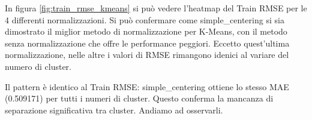 In figura \ref{fig:train_rmse_kmeans} si può vedere l'heatmap del Train RMSE per le 4 differenti normalizzazioni. Si può confermare come simple\_centering si sia dimostrato il miglior metodo di normalizzazione per K-Means, con il metodo senza normalizzazione che offre le performance peggiori. Eccetto quest'ultima normalizzazione, nelle altre i valori di RMSE rimangono idenici al variare del numero di cluster.

\begin{table}[H]
  \centering
  \caption{Top 5 Configurazioni per Train MAE - Run K-Means}
\end{table}

Il pattern è identico al Train RMSE: simple\_centering ottiene lo stesso MAE (0.509171) per tutti i numeri di cluster. Questo conferma la mancanza di separazione significativa tra cluster. Andiamo ad osservarli.

